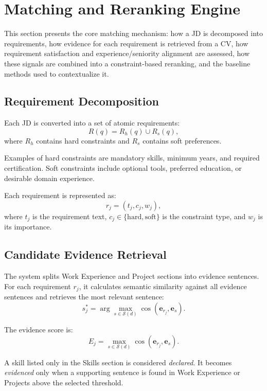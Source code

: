\documentclass[12pt,a4paper,oneside]{report}
\begin{document}
\section{Matching and Reranking Engine}
This section presents the core matching mechanism: how a JD is decomposed into requirements, how evidence for each requirement is retrieved from a CV, how requirement satisfaction and experience/seniority alignment are assessed, how these signals are combined into a constraint-based reranking, and the baseline methods used to contextualize it.

\subsection{Requirement Decomposition}
Each JD is converted into a set of atomic requirements:
\begin{equation}
R(q)=R_h(q)\cup R_s(q),
\end{equation}
where $R_h$ contains hard constraints and $R_s$ contains soft preferences.

Examples of hard constraints are mandatory skills, minimum years, and required certification. Soft constraints include optional tools, preferred education, or desirable domain experience.

Each requirement is represented as:
\begin{equation}
r_j=(t_j,c_j,w_j),
\end{equation}
where $t_j$ is the requirement text, $c_j\in\{\text{hard},\text{soft}\}$ is the constraint type, and $w_j$ is its importance.

\subsection{Candidate Evidence Retrieval}
The system splits Work Experience and Project sections into evidence sentences. For each requirement $r_j$, it calculates semantic similarity against all evidence sentences and retrieves the most relevant sentence:
\begin{equation}
s_j^*=\arg\max_{s\in \mathcal{S}(d)} \operatorname{cos}(\mathbf{e}_{r_j},\mathbf{e}_s).
\end{equation}

The evidence score is:
\begin{equation}
E_j=\max_{s\in \mathcal{S}(d)} \operatorname{cos}(\mathbf{e}_{r_j},\mathbf{e}_s).
\end{equation}

A skill listed only in the Skills section is considered \emph{declared}. It becomes \emph{evidenced} only when a supporting sentence is found in Work Experience or Projects above the selected threshold.
\end{document}
